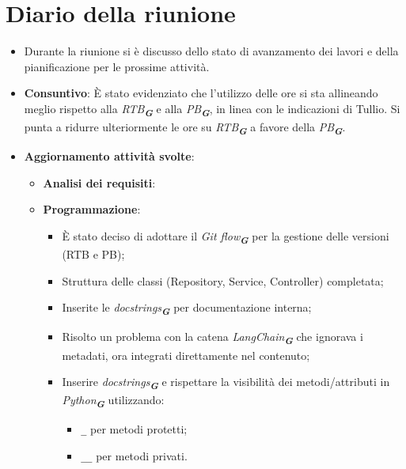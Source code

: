 
\section{Diario della riunione}

\begin{itemize}
    \item Durante la riunione si è discusso dello stato di avanzamento dei lavori e della pianificazione per le prossime attività.  

    \item \textbf{Consuntivo}:  
    È stato evidenziato che l'utilizzo delle ore si sta allineando meglio rispetto alla \emph{RTB}\textsubscript{\textit{\textbf{G}}} e alla \emph{PB}\textsubscript{\textit{\textbf{G}}}, in linea con le indicazioni di Tullio. Si punta a ridurre ulteriormente le ore su \emph{RTB}\textsubscript{\textit{\textbf{G}}} a favore della \emph{PB}\textsubscript{\textit{\textbf{G}}}.  

    \item \textbf{Aggiornamento attività svolte}:  
    \begin{itemize}
        \item \textbf{Analisi dei requisiti}:  

        \item \textbf{Programmazione}:  
        \begin{itemize}
            \item È stato deciso di adottare il \emph{Git flow}\textsubscript{\textit{\textbf{G}}} per la gestione delle versioni (RTB e PB);
            \item Struttura delle classi (Repository, Service, Controller) completata;
            \item Inserite le \emph{docstrings}\textsubscript{\textit{\textbf{G}}} per documentazione interna;
            \item Risolto un problema con la catena \emph{LangChain}\textsubscript{\textit{\textbf{G}}} che ignorava i metadati, ora integrati direttamente nel contenuto;
            \item Inserire \emph{docstrings}\textsubscript{\textit{\textbf{G}}} e rispettare la visibilità dei metodi/attributi in \emph{Python}\textsubscript{\textit{\textbf{G}}} utilizzando:  
            \begin{itemize}
                \item \texttt{\_} per metodi protetti;
                \item \texttt{\_\_} per metodi privati.  
            \end{itemize}
        \end{itemize}


\end{itemize}
\end{itemize}
